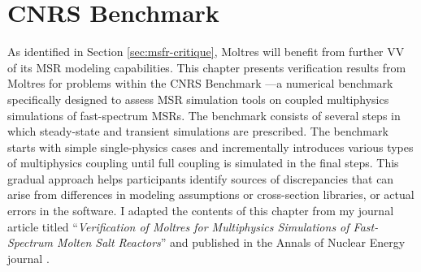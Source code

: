 \section{CNRS Benchmark}

As identified in Section \ref{sec:msfr-critique},
Moltres will benefit from further \gls{VV} of its
\gls{MSR} modeling capabilities. This chapter presents verification
results from Moltres for problems within the CNRS Benchmark
\cite{tiberga_results_2020}---a numerical benchmark specifically designed to
assess \gls{MSR} simulation tools on coupled multiphysics simulations of
fast-spectrum \glspl{MSR}. The benchmark consists of several steps in which
steady-state and transient simulations are prescribed. The benchmark starts with simple
single-physics cases and incrementally introduces various types of
multiphysics coupling until full coupling is simulated in the final steps. This
gradual approach helps participants identify sources of discrepancies
that can arise from differences in modeling assumptions or
cross-section libraries, or actual errors in the software. I adapted the
contents of this chapter from my journal article titled
``\textit{Verification of Moltres for Multiphysics Simulations of Fast-Spectrum
Molten Salt Reactors}'' and published in the Annals of Nuclear Energy journal
\cite{park_verification_2022}.





